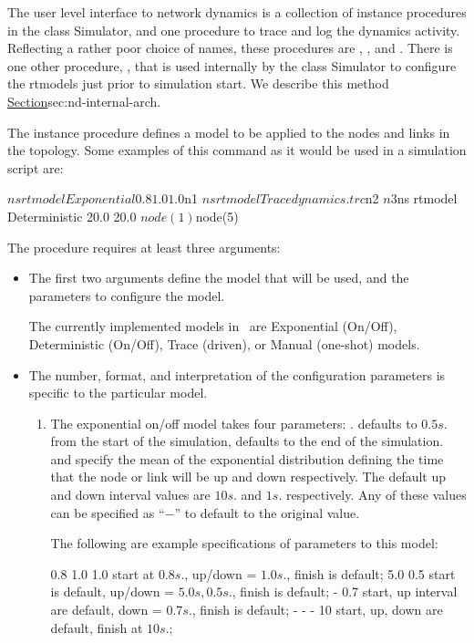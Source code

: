 The user level interface to network dynamics is a collection 
of instance procedures in the class Simulator,
and one procedure to trace and log the dynamics activity.
Reflecting a rather poor choice of names,
these procedures are
, , and .
There is one other procedure, ,
that is used internally by the class Simulator to configure
the rtmodels just prior to simulation start.
We describe this method \href{later}{Section}{sec:nd-internal-arch}.
\begin{list}{---}{}
\item The instance procedure
defines a model to be applied to the nodes and links in the topology.
Some examples of this command as it would be used in a simulation script are:
\begin{program}
        $ns rtmodel Exponential {0.8 1.0 1.0} $n1
        $ns rtmodel Trace dynamics.trc  $n2 $n3
        $ns rtmodel Deterministic {20.0 20.0} $node(1) $node(5)
\end{program}
The procedure requires at least three arguments:
\begin{itemize}
\item %
The first two arguments define the model that will be used, and the
parameters to configure the model.

The currently implemented models in \ns\ are
Exponential (On/Off), Deterministic (On/Off), Trace (driven), or
Manual (one-shot) models.

\item %
The number, format, and interpretation of the configuration parameters
is specific to the particular model.
\begin{enumerate}\itemsep0pt
\item The exponential on/off model takes four parameters:
.
 defaults to $0.5s.$ from the start of the simulation,
 defaults to the end of the simulation.
 and  specify
the mean of the exponential distribution defining the time
that the node or link will be up and down respectively.
The default up and down interval values are $10s.$ and $1s.$ respectively.
Any of these values can be specified as ``$-$'' to default to the
original value.

The following are example specifications of parameters to this model:
\begin{program}
      0.8 1.0 1.0       \; start at \(0.8s.\), up/down = \(1.0s.\), finish is default;
      5.0 0.5           \; start is default, up/down = \(5.0s, 0.5s.\), finish is default;
      - 0.7             \; start, up interval are default, down = \(0.7s.\), finish is default;
      - - - 10          \; start, up, down are default, finish at \(10s.\);
\end{program}


\end{enumerate}
\end{itemize}
\end{list}
